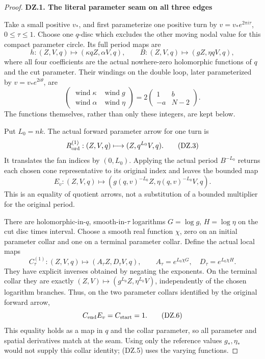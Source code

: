 \begin{proof}
\par

\medskip\noindent\textbf{DZ.1. The literal parameter seam on all three edges}

\par\nobreak

Take a small positive \(v_*\), and first parameterize one positive
turn by \(v=v_*e^{2\pi i\tau}\), \(0\leq\tau\leq1\). Choose one
\(q\)-disc which excludes the other moving nodal value for this
compact parameter circle. Its full period maps are
\[
 h:(Z,V,q)\longmapsto(\kappa qZ,\alpha V,q),\qquad
 B:(Z,V,q)\longmapsto(gZ,\eta qV,q),                 \tag{DZ.1}
\]
where all four coefficients are the actual nowhere-zero holomorphic
functions of \(q\) and the cut parameter. Their windings on the
double loop, later parameterized by \(v=v_*e^{2i\theta}\), are
\[
 \begin{pmatrix}\operatorname{wind}\kappa&
                 \operatorname{wind}g\\
                 \operatorname{wind}\alpha&
                 \operatorname{wind}\eta\end{pmatrix}
       =2\begin{pmatrix}1&b\\-a&N-2\end{pmatrix}.    \tag{DZ.2}
\]
The functions themselves, rather than only these integers, are kept
below.

Put \(L_0=nk\). The actual forward parameter arrow for one turn is
\[
 R_{\rm ord}^{(1)}:(Z,V,q)\longmapsto(Z,q^{L_0}V,q). \tag{DZ.3}
\]
It translates the fan indices by \((0,L_0)\). Applying the actual
period \(B^{-L_0}\) returns each chosen cone representative to its
original index and leaves the bounded map
\[
 E_v:(Z,V,q)\longmapsto(g(q,v)^{-L_0}Z,
                         \eta(q,v)^{-L_0}V,q).     \tag{DZ.4}
\]
This is an equality of quotient arrows, not a substitution of a
bounded multiplier for the original period.

There are holomorphic-in-\(q\), smooth-in-\(\tau\) logarithms
\(G=\log g\), \(H=\log\eta\) on the cut disc times interval. Choose a
smooth real function \(\chi\), zero on an initial parameter collar and
one on a terminal parameter collar. Define the actual local maps
\[
 C^{(1)}_\tau:(Z,V,q)\longmapsto
       (A_\tau Z,D_\tau V,q),\qquad
 A_\tau=e^{L_0\chi G},\quad D_\tau=e^{L_0\chi H}.    \tag{DZ.5}
\]
They have explicit inverses obtained by negating the exponents.
On the terminal collar they are exactly
\((Z,V)\mapsto(g^{L_0}Z,\eta^{L_0}V)\), independently of the chosen logarithm
branches. Thus, on the two parameter collars identified by the
original forward arrow,
\[
                     C_{\rm end}E_v=C_{\rm start}=1. \tag{DZ.6}
\]
This equality holds as a map in \(q\) and the collar parameter, so
all parameter and spatial derivatives match at the seam. Using only
the reference values \(g_*,\eta_*\) would not supply this collar
identity; (DZ.5) uses the varying functions.


\end{proof}
